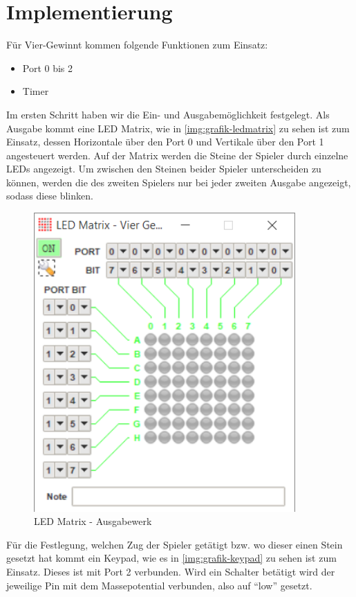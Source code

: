 \FloatBarrier
\chapter{Implementierung}
Für Vier-Gewinnt kommen folgende Funktionen zum Einsatz:
\begin{itemize}	
	\item Port 0 bis 2
	\item Timer
\end{itemize}

Im ersten Schritt haben wir die Ein- und Ausgabemöglichkeit festgelegt. Als Ausgabe kommt eine LED Matrix, wie in \autoref{img:grafik-ledmatrix} zu sehen ist zum Einsatz, dessen Horizontale über den Port 0 und Vertikale über den Port 1 angesteuert werden. Auf der Matrix werden die Steine der Spieler durch einzelne LEDs angezeigt.
Um zwischen den Steinen beider Spieler unterscheiden zu können, werden die des zweiten Spielers nur bei jeder zweiten Ausgabe angezeigt, sodass diese blinken.


\begin{figure}
	\centering
	\includegraphics[width=10cm]{ledmatrix.png}
	\caption{LED Matrix - Ausgabewerk}
	\label{img:grafik-ledmatrix}
\end{figure}

Für die Festlegung, welchen Zug der Spieler getätigt bzw. wo dieser einen Stein gesetzt hat kommt ein Keypad, wie es in \autoref{img:grafik-keypad} zu sehen ist zum Einsatz.
Dieses ist mit Port 2 verbunden. Wird ein Schalter betätigt wird der jeweilige Pin mit dem Massepotential verbunden, also auf \enquote{low} gesetzt.

